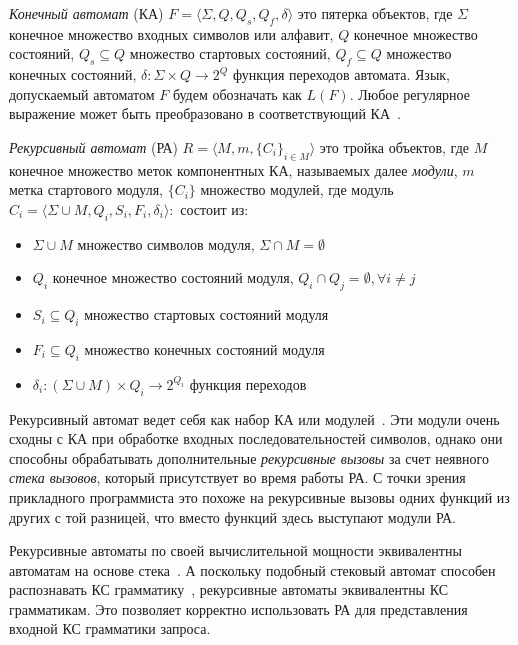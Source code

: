 \documentclass[14pt]{matmex-diploma-custom}
\begin{document}
\textit{Конечный автомат} (КА) $F = \langle \Sigma, Q, Q_s, Q_f, \delta \rangle$ это пятерка объектов, где $\Sigma$ конечное множество входных символов или алфавит, $Q$ конечное множество состояний, $Q_s \subseteq Q$ множество стартовых состояний, $Q_f \subseteq Q$ множество конечных состояний, $\delta : \Sigma \times Q \rightarrow 2^Q$ функция переходов автомата. Язык, допускаемый автоматом $F$ будем обозначать как $L(F)$. Любое регулярное выражение может быть преобразовано в соответствующий КА~\cite{book:automata_theory}. 

\textit{Рекурсивный автомат} (РА) $R = \langle M, m, \{C_i\}_{i \in M} \rangle$ это тройка объектов, где $M$ конечное множество меток компонентных КА, называемых далее \textit{модули}, $m$ метка стартового модуля, $\{C_i\}$ множество модулей, где модуль $C_i = \langle \Sigma \cup M, Q_i, S_i, F_i, \delta _i \rangle: $ состоит из:

\begin{itemize}
    \item $\Sigma \cup M$ множество символов модуля, $\Sigma \cap M = \emptyset$
    \item $Q_i$ конечное множество состояний модуля, $Q_i \cap Q_j = \emptyset, \forall i \neq j$
    \item $S_i \subseteq Q_i$ множество стартовых состояний модуля
    \item $F_i \subseteq Q_i$ множество конечных состояний модуля 
    \item $\delta_i : (\Sigma \cup M) \times Q_i \rightarrow 2^{Q_i}$ функция переходов
\end{itemize}

Рекурсивный автомат ведет себя как набор КА или модулей~\cite{article:recursive_state_machines}. Эти модули очень сходны с КА при обработке входных последовательностей символов, однако они способны обрабатывать дополнительные \textit{рекурсивные вызовы} за счет неявного \textit{стека вызовов}, который присутствует во время работы РА. С точки зрения прикладного программиста это похоже на рекурсивные вызовы одних функций из других с той разницей, что вместо функций здесь выступают модули РА.

Рекурсивные автоматы по своей вычислительной мощности эквивалентны автоматам на основе стека~\cite{article:recursive_state_machines}. А поскольку подобный стековый автомат способен распознавать КС грамматику~\cite{book:automata_theory}, рекурсивные автоматы эквивалентны КС грамматикам. Это позволяет корректно использовать РА для представления входной КС грамматики запроса.
\end{document}
